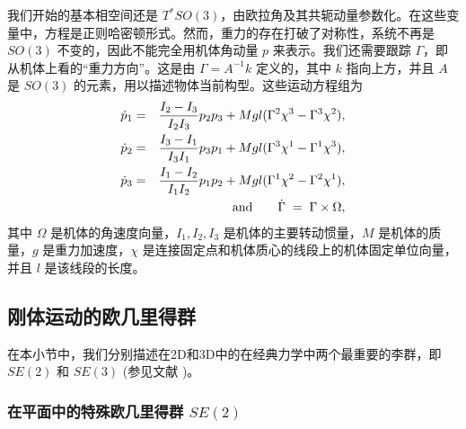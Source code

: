 \documentclass[11pt,fontset=founder]{ctexart}
\begin{document}
我们开始的基本相空间还是 $T^{\ast }SO(3)$，由欧拉角及其共轭动量参数化。在这些变量中，方程是正则哈密顿形式。然而，重力的存在打破了对称性，系统不再是 $SO(3)$ 不变的，因此不能完全用机体角动量 $p$ 来表示。我们还需要跟踪 $\Gamma $，即从机体上看的“重力方向”。这是由 $\Gamma =A^{-1}k$ 定义的，其中 $k$ 指向上方，并且 $A$ 是 $SO(3)$ 的元素，用以描述物体当前构型。这些运动方程组为
\begin{eqnarray*}
\dot{p}_{1} &=&\frac{I_{2}-I_{3}}{I_{2}I_{3}}p_{2}p_{3}+Mgl(\Gamma ^{2}\chi
^{3}-\Gamma ^{3}\chi ^{2}), \\
\dot{p}_{2} &=&\frac{I_{3}-I_{1}}{I_{3}I_{1}}p_{3}p_{1}+Mgl(\Gamma ^{3}\chi
^{1}-\Gamma ^{1}\chi ^{3}), \\
\dot{p}_{3} &=&\frac{I_{1}-I_{2}}{I_{1}I_{2}}p_{1}p_{2}+Mgl(\Gamma ^{1}\chi
^{2}-\Gamma ^{2}\chi ^{1}), \\
&&\text{and\qquad }\dot{\Gamma}\;=\;\Gamma \times \Omega ,
\end{eqnarray*}%
其中 $\Omega $ 是机体的角速度向量，$I_{1},I_{2},I_{3}$ 是机体的主要转动惯量，$M$ 是机体的质量，$g$ 是重力加速度，$\chi $ 是连接固定点和机体质心的线段上的机体固定单位向量，并且 $l$ 是该线段的长度。

\subsection{刚体运动的欧几里得群}

在本小节中，我们分别描述在2D和3D中的在经典力学中两个最重要的李群，即 $SE(2)$ 和 $SE(3)$ (参见文献 \cite{Marsden,GaneshSprBig,GaneshADG})。

\subsubsection{在平面中的特殊欧几里得群 $SE(2)$}

\label{SE(2)}
\end{document}
